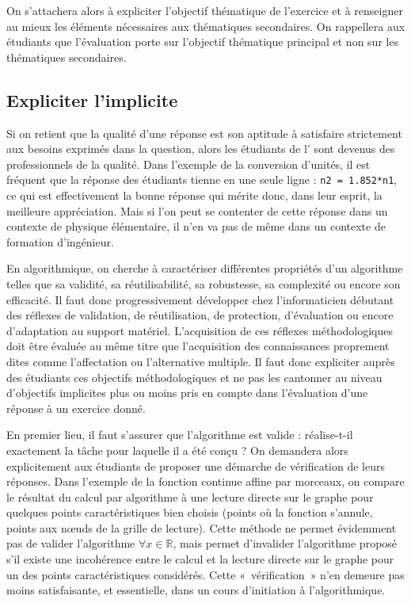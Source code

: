 On s'attachera alors à expliciter l'objectif thématique de l'exercice et
à renseigner au mieux les éléments nécessaires aux thématiques secondaires.
On rappellera aux étudiants que l'évalua\-tion porte sur l'objectif thématique
principal et non sur les thématiques secondaires.


\subsection{Expliciter l'implicite}\label{subsec:qualite}
Si on retient que la qualité d'une réponse est son aptitude à satisfaire
strictement aux besoins exprimés dans la question, alors les étudiants de l'\enib{} sont 
devenus des professionnels de la qualité. 
Dans l'exemple de la conversion d'unités,
il est fréquent que la réponse des étudiants tienne en une seule ligne : 
\texttt{n2 = 1.852*n1}, ce qui est effectivement la bonne réponse qui 
mérite donc, dans leur esprit, la meilleure appréciation.
Mais si l'on peut se contenter de cette réponse dans un contexte de physique
élémentaire, il n'en va pas de même dans un contexte de formation d'ingénieur.

En algorithmique, on cherche à caractériser différentes propriétés d'un algorithme
telles que sa validité, sa réutilisabilité, sa robustesse, sa complexité 
ou encore son efficacité. Il faut donc progressivement développer chez 
l'informaticien débutant des réflexes de validation, de réutilisation, 
de protection, d'évaluation ou encore d'adaptation au support matériel.
L'acquisition de ces réflexes méthodologiques doit être évaluée au même titre
que l'acquisition des connaissances proprement dites comme l'affectation ou 
l'alternative multiple. Il faut donc expliciter auprès des étudiants ces objectifs méthodologiques et ne pas les cantonner au niveau d'objectifs implicites
plus ou moins pris en compte dans l'évaluation d'une réponse à un exercice donné.

En premier lieu, il faut s'assurer que l'algorithme est valide :
réalise-t-il exactement la tâche pour laquelle il a été conçu ?
On demandera alors explicitement aux étudiants de proposer une démarche 
de vérification de leurs réponses. 
Dans l'exemple de la fonction continue affine par morceaux, on compare le résultat
du calcul par algorithme à une lecture directe sur le graphe pour quelques points caractéristiques bien choisis (points où la fonction s'annule,  
points aux n\oe uds de la grille de lecture). Cette méthode ne permet évidemment
pas de valider l'algorithme $\forall x \in \mathbb{R}$, mais permet d'invalider
l'algorithme proposé s'il existe une incohérence entre le calcul et la lecture
directe sur le graphe pour un des points caractéristiques considérés.
Cette «~vérification~» n'en demeure pas moins satisfaisante, et essentielle, 
dans un cours d'initiation à l'algorithmique.

